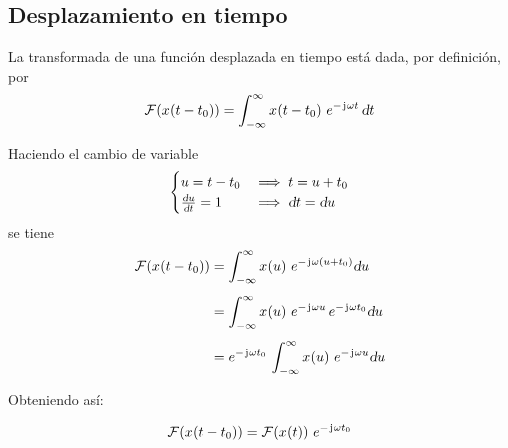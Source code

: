 \subsection{Desplazamiento en tiempo}

La transformada de una función desplazada en tiempo está dada, por definición, por
\[
    \fourier{\fx[x]{t - t_0}}
    = \int_{-\infty}^\infty \fx[x]{t - t_0} \, e^{- \iu \omega t} \, \dif t
\]

Haciendo el cambio de variable
\[
    \begin{cases}
        u = t - t_0 & \implies t = u + t_0
        \\
        \deriv[u]{t} = 1 & \implies \dif t = \dif u
    \end{cases}
\]
se tiene
\begin{align*}
    \fourier{\fx[x]{t - t_0}}
    & = \int_{-\infty}^{\infty} \fx[x]{u} \, e^{- \iu \omega (u + t_0)} \dif u
    \\[1ex]
    & = \int_{-\infty}^{\infty} \fx[x]{u} \, e^{- \iu \omega u} \, e^{- \iu \omega t_0} \dif u
    \\[1ex]
    & = e^{- \iu \omega t_0} \, \int_{-\infty}^{\infty} \fx[x]{u} \, e^{- \iu \omega u} \dif u
\end{align*}

Obteniendo así:

\begin{mdframed}[style=PropertyFrame]
    \begin{prop}
    \end{prop}
    \[
        \fourier{\fx[x]{t - t_0}} = \fourier{\fx[x]{t}} \, e^{- \iu \omega t_0}
    \]
\end{mdframed}

